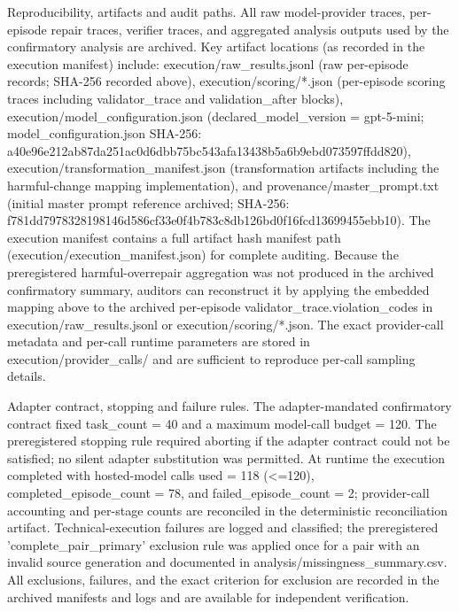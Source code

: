 \documentclass[conference]{IEEEtran}
\begin{document}
Reproducibility, artifacts and audit paths. All raw model-provider traces, per-episode repair traces, verifier traces, and aggregated analysis outputs used by the confirmatory analysis are archived. Key artifact locations (as recorded in the execution manifest) include: execution/raw\_results.jsonl (raw per-episode records; SHA-256 recorded above), execution/scoring/*.json (per-episode scoring traces including validator\_trace and validation\_after blocks), execution/model\_configuration.json (declared\_model\_version = gpt-5-mini; model\_configuration.json SHA-256: a40e96e2\allowbreak{}12ab87da\allowbreak{}251ac0d6\allowbreak{}dbb75bc5\allowbreak{}43afa134\allowbreak{}38b5a6b9\allowbreak{}ebd07359\allowbreak{}7ffdd820), execution/transformation\_manifest.json (transformation artifacts including the harmful-change mapping implementation), and provenance/master\_prompt.txt (initial master prompt reference archived; SHA-256: f781dd79\allowbreak{}78328198\allowbreak{}146d586c\allowbreak{}f33e0f4b\allowbreak{}783c8db1\allowbreak{}26bd0f16\allowbreak{}fcd13699\allowbreak{}455ebb10). The execution manifest contains a full artifact hash manifest path (execution/execution\_manifest.json) for complete auditing. Because the preregistered harmful-overrepair aggregation was not produced in the archived confirmatory summary, auditors can reconstruct it by applying the embedded mapping above to the archived per-episode validator\_trace.violation\_codes in execution/raw\_results.jsonl or execution/scoring/*.json. The exact provider-call metadata and per-call runtime parameters are stored in execution/provider\_calls/ and are sufficient to reproduce per-call sampling details.

Adapter contract, stopping and failure rules. The adapter-mandated confirmatory contract fixed task\_count = 40 and a maximum model-call budget = 120. The preregistered stopping rule required aborting if the adapter contract could not be satisfied; no silent adapter substitution was permitted. At runtime the execution completed with hosted-model calls used = 118 (<=120), completed\_episode\_count = 78, and failed\_episode\_count = 2; provider-call accounting and per-stage counts are reconciled in the deterministic reconciliation artifact. Technical-execution failures are logged and classified; the preregistered 'complete\_pair\_primary' exclusion rule was applied once for a pair with an invalid source generation and documented in analysis/missingness\_summary.csv. All exclusions, failures, and the exact criterion for exclusion are recorded in the archived manifests and logs and are available for independent verification.
\end{document}
